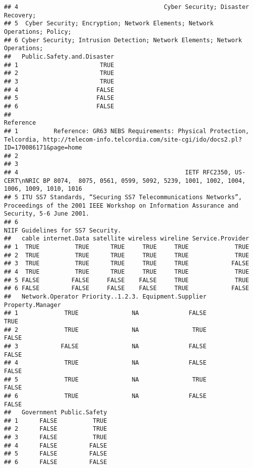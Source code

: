\documentclass[
]{article}
\begin{document}
\begin{verbatim}
## 4                                         Cyber Security; Disaster Recovery;
## 5  Cyber Security; Encryption; Network Elements; Network Operations; Policy;
## 6 Cyber Security; Intrusion Detection; Network Elements; Network Operations;
##   Public.Safety.and.Disaster
## 1                       TRUE
## 2                       TRUE
## 3                       TRUE
## 4                      FALSE
## 5                      FALSE
## 6                      FALSE
##                                                                                                                                                    Reference
## 1          Reference: GR63 NEBS Requirements: Physical Protection, Telcordia, http://telecom-info.telcordia.com/site-cgi/ido/docs2.pl?ID=170086171&page=home
## 2                                                                                                                                                           
## 3                                                                                                                                                           
## 4                                               IETF RFC2350, US-CERT\nNRIC BP 8074,  8075, 0561, 0599, 5092, 5239, 1001, 1002, 1004, 1006, 1009, 1010, 1016
## 5 ITU SS7 Standards, “Securing SS7 Telecommunications Networks”, Proceedings of the 2001 IEEE Workshop on Information Assurance and Security, 5-6 June 2001.
## 6                                                                                                                          NIIF Guidelines for SS7 Security.
##   cable internet.Data satellite wireless wireline Service.Provider
## 1  TRUE          TRUE      TRUE     TRUE     TRUE             TRUE
## 2  TRUE          TRUE      TRUE     TRUE     TRUE             TRUE
## 3  TRUE          TRUE      TRUE     TRUE     TRUE            FALSE
## 4  TRUE          TRUE      TRUE     TRUE     TRUE             TRUE
## 5 FALSE         FALSE     FALSE    FALSE     TRUE             TRUE
## 6 FALSE         FALSE     FALSE    FALSE     TRUE            FALSE
##   Network.Operator Priority..1.2.3. Equipment.Supplier Property.Manager
## 1             TRUE               NA              FALSE             TRUE
## 2             TRUE               NA               TRUE            FALSE
## 3            FALSE               NA              FALSE            FALSE
## 4             TRUE               NA              FALSE            FALSE
## 5             TRUE               NA               TRUE            FALSE
## 6             TRUE               NA              FALSE            FALSE
##   Government Public.Safety
## 1      FALSE          TRUE
## 2      FALSE          TRUE
## 3      FALSE          TRUE
## 4      FALSE         FALSE
## 5      FALSE         FALSE
## 6      FALSE         FALSE
\end{verbatim}
\end{document}
